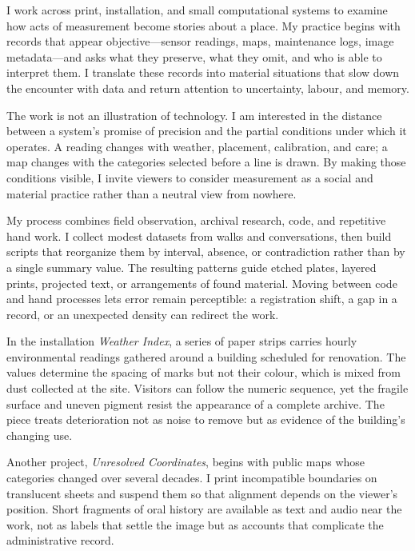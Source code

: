 \documentclass[type=artist]{careerdossier-statement}
\begin{document}
\MakeCDossierStatementHeader


I work across print, installation, and small computational systems to examine
how acts of measurement become stories about a place. My practice begins with
records that appear objective---sensor readings, maps, maintenance logs, image
metadata---and asks what they preserve, what they omit, and who is able to
interpret them. I translate these records into material situations that slow
down the encounter with data and return attention to uncertainty, labour, and
memory.

The work is not an illustration of technology. I am interested in the distance
between a system's promise of precision and the partial conditions under which
it operates. A reading changes with weather, placement, calibration, and care;
a map changes with the categories selected before a line is drawn. By making
those conditions visible, I invite viewers to consider measurement as a social
and material practice rather than a neutral view from nowhere.


My process combines field observation, archival research, code, and repetitive
hand work. I collect modest datasets from walks and conversations, then build
scripts that reorganize them by interval, absence, or contradiction rather than
by a single summary value. The resulting patterns guide etched plates, layered
prints, projected text, or arrangements of found material. Moving between code
and hand processes lets error remain perceptible: a registration shift, a gap
in a record, or an unexpected density can redirect the work.

In the installation \emph{Weather Index}, a series of paper strips carries
hourly environmental readings gathered around a building scheduled for
renovation. The values determine the spacing of marks but not their colour,
which is mixed from dust collected at the site. Visitors can follow the numeric
sequence, yet the fragile surface and uneven pigment resist the appearance of a
complete archive. The piece treats deterioration not as noise to remove but as
evidence of the building's changing use.

Another project, \emph{Unresolved Coordinates}, begins with public maps whose
categories changed over several decades. I print incompatible boundaries on
translucent sheets and suspend them so that alignment depends on the viewer's
position. Short fragments of oral history are available as text and audio near
the work, not as labels that settle the image but as accounts that complicate
the administrative record.
\end{document}
